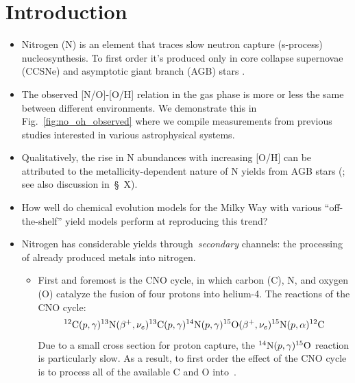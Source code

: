 \documentclass[ms.tex]{subfiles}
\begin{document}
 

\section{Introduction} 
\begin{itemize} 
	\item Nitrogen (N) is an element that traces slow neutron capture 
	(s-process) nucleosynthesis. To first order it's produced only in core 
	collapse supernovae (CCSNe) and asymptotic giant branch (AGB) stars 
	\citep{Johnson2019}. 

	\item The observed [N/O]-[O/H] relation in the gas phase is more or less 
	the same between different environments. 
	We demonstrate this in Fig.~\ref{fig:no_oh_observed} where we compile 
	measurements from previous studies interested in various astrophysical 
	systems. 

	\item Qualitatively, the rise in N abundances with increasing [O/H] can be 
	attributed to the metallicity-dependent nature of N yields from AGB stars 
	(\citealp{Vincenzo2016}; see also discussion in~\S~X). 

	\item How well do chemical evolution models for the Milky Way with various 
	``off-the-shelf'' yield models perform at reproducing this trend? 

	\item Nitrogen has considerable yields through~\textit{secondary} channels: 
	the processing of already produced metals into nitrogen. 
	\begin{itemize} 
		\item First and foremost is the CNO cycle, in which carbon (C), N, and 
		oxygen (O) catalyze the fusion of four protons into helium-4. The 
		reactions of the CNO cycle: 
		\begin{equation} 
		^{12}\text{C}(p,\gamma)^{13}\text{N}(\beta^+,\nu_e)^{13}\text{C} 
		(p,\gamma)^{14}\text{N}(p,\gamma)^{15}\text{O}(\beta^+,\nu_e)
		^{15}\text{N}(p,\alpha)^{12}\text{C} 
		\end{equation} 
		Due to a small cross section for proton capture, the 
		$^{14}\text{N}(p,\gamma)^{15}\text{O}$ reaction is particularly slow. 
		As a result, to first order the effect of the CNO cycle is to process 
		all of the available C and O into~\Nfourteen. 
	\end{itemize} 
\end{itemize} 
\end{document}
